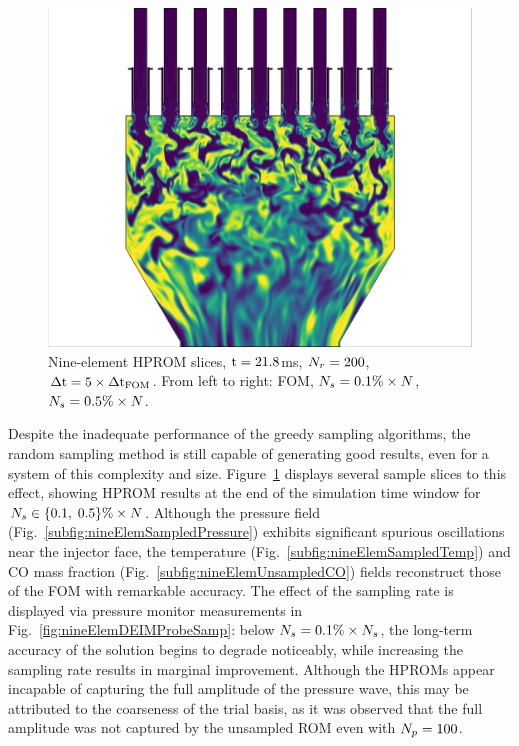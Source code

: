 \begin{figure}
{\begin{minipage}{0.32\linewidth}
		\includegraphics[width=0.99\linewidth,trim={0.5em 0.5em 15.0em 0.5em},clip]{Chapters/HPROMResults/Images/nineElem/deim/contours/deim_0p005_co_z.png}
	\end{minipage}
	}

	\caption{\label{fig:nineElemDEIMContours}Nine-element HPROM slices, $\text{t} = 21.8$ms, $N_r = 200$, $\Delta \text{t} = 5 \times \Delta \text{t}_{\text{FOM}}$. From left to right: FOM, $N_s = 0.1\% \times N$, $N_s = 0.5\% \times N$.}
\end{figure}

Despite the inadequate performance of the greedy sampling algorithms, the random sampling method is still capable of generating good results, even for a system of this complexity and size. Figure~\ref{fig:nineElemDEIMContours} displays several sample slices to this effect, showing HPROM results at the end of the simulation time window for $N_s \in \{0.1, \; 0.5 \}\% \times N$. Although the pressure field (Fig.~\ref{subfig:nineElemSampledPressure}) exhibits significant spurious oscillations near the injector face, the temperature (Fig.~\ref{subfig:nineElemSampledTemp}) and CO mass fraction (Fig.~\ref{subfig:nineElemUnsampledCO}) fields reconstruct those of the FOM with remarkable accuracy. The effect of the sampling rate is displayed via pressure monitor measurements in Fig.~\ref{fig:nineElemDEIMProbeSamp}: below $N_s = 0.1\% \times N_s$, the long-term accuracy of the solution begins to degrade noticeably, while increasing the sampling rate results in marginal improvement. Although the HPROMs appear incapable of capturing the full amplitude of the pressure wave, this may be attributed to the coarseness of the trial basis, as it was observed that the full amplitude was not captured by the unsampled ROM even with $N_p = 100$.

